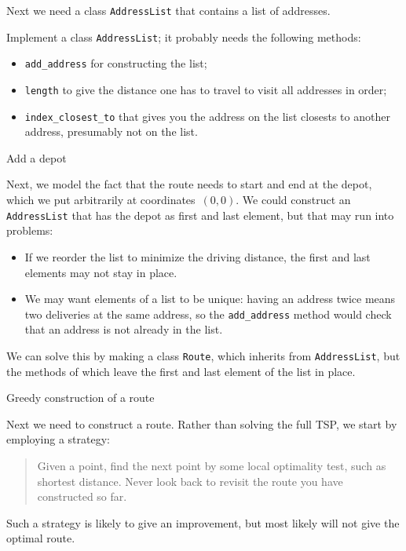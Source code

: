 Next we need a class \lstinline{AddressList} that contains a list of
addresses.

\begin{exercise}
  Implement a class \lstinline{AddressList}; it probably needs the
  following methods:
  \begin{itemize}
  \item \lstinline{add_address} for constructing the list;
  \item \lstinline{length} to give the distance one has to travel to
    visit all addresses in order;
  \item \lstinline{index_closest_to} that gives you the address on the
    list closests to another address, presumably not on the list.
  \end{itemize}
\end{exercise}

 {Add a depot}

Next, we model the fact that the route
needs to start and end at the depot, which we put arbitrarily at
coordinates~$(0,0)$. We could construct an \lstinline{AddressList}
that has the depot as first and last element, but that may run into
problems:
\begin{itemize}
\item If we reorder the list to minimize the driving distance, the
  first and last elements may not stay in place.
\item We may want elements of a list to be unique: having an address
  twice means two deliveries at the same address, so the
  \lstinline{add_address} method would check that an address is not
  already in the list.
\end{itemize}
We can solve this by making a class \lstinline{Route}, which inherits
from \lstinline{AddressList}, but the methods of which leave the first
and last element of the list in place.

 {Greedy construction of a route}

%
Next we need to construct a route. Rather than solving the full
\ac{TSP}, we start by employing a  strategy:
\begin{quote}
  Given a point, find the next point by some local optimality test,
  such as shortest distance. Never look back to revisit the route you
  have constructed so far.
\end{quote}
Such a strategy is likely to give an improvement, but most likely will
not give the optimal route.

